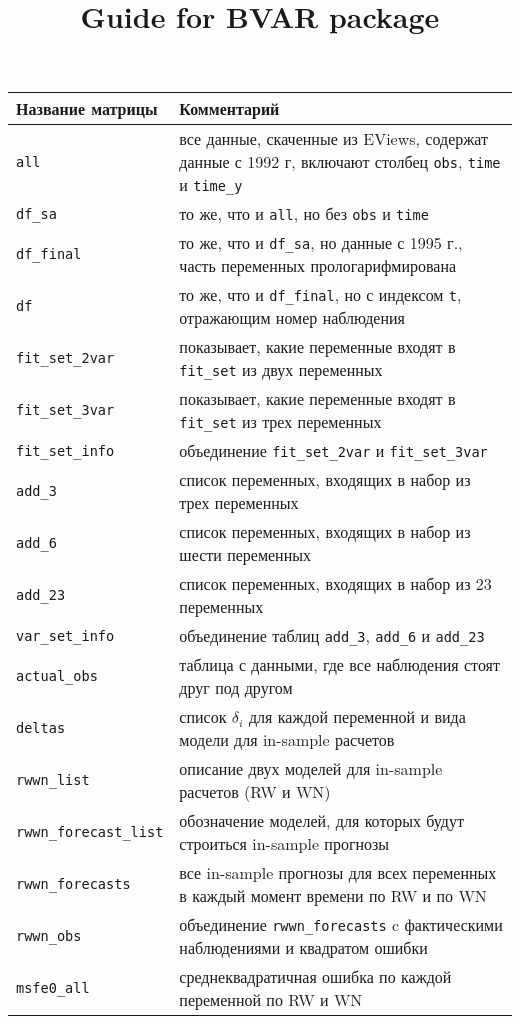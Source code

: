 \documentclass[11pt]{article} %
\title{Guide for BVAR package}
\begin{document}
\begin{center}
\begin{table}[h!]
\begin{tabular}{lp{12cm}}
\toprule
Название матрицы & Комментарий \\
\midrule
 \verb|all| & все данные, скаченные из EViews, содержат данные с 1992 г, включают столбец \verb|obs|, \verb|time| и \verb|time_y|\\
 \verb|df_sa| & то же, что и \verb|all|, но без \verb|obs| и \verb|time|\\
 \verb|df_final| & то же, что и \verb|df_sa|, но данные с 1995 г., часть переменных прологарифмирована\\ 
 \verb|df| & то же, что и \verb|df_final|, но с индексом \verb|t|, отражающим номер наблюдения\\
\midrule
 \verb|fit_set_2var| & показывает, какие переменные входят в \verb|fit_set| из двух переменных\\
 \verb|fit_set_3var| & показывает, какие переменные входят в \verb|fit_set| из трех переменных\\
 \verb|fit_set_info| & объединение \verb|fit_set_2var| и \verb|fit_set_3var| \\
 \verb|add_3| & список переменных, входящих в набор из трех переменных\\
 \verb|add_6| & список переменных, входящих в набор из шести переменных\\
 \verb|add_23| & список переменных, входящих в набор из 23 переменных\\
 \verb|var_set_info| & объединение таблиц \verb|add_3|, \verb|add_6| и \verb|add_23| \\
\midrule
 \verb|actual_obs| & таблица с данными, где все наблюдения стоят друг под другом\\
 \verb|deltas| & список $\delta_i$ для каждой переменной и вида модели для in-sample расчетов\\
 \verb|rwwn_list| & описание двух моделей для in-sample расчетов (RW и WN)\\
 \verb|rwwn_forecast_list| & обозначение моделей, для которых будут строиться in-sample прогнозы\\
\midrule
 \verb|rwwn_forecasts| & все in-sample прогнозы для всех переменных в каждый момент времени по RW и по WN\\
 \verb|rwwn_obs| & объединение \verb|rwwn_forecasts| c фактическими наблюдениями и квадратом ошибки\\ 
 \verb|msfe0_all| & среднеквадратичная ошибка по каждой переменной по RW и WN\\

\end{tabular}
\end{table}
\end{center}
\end{document}

